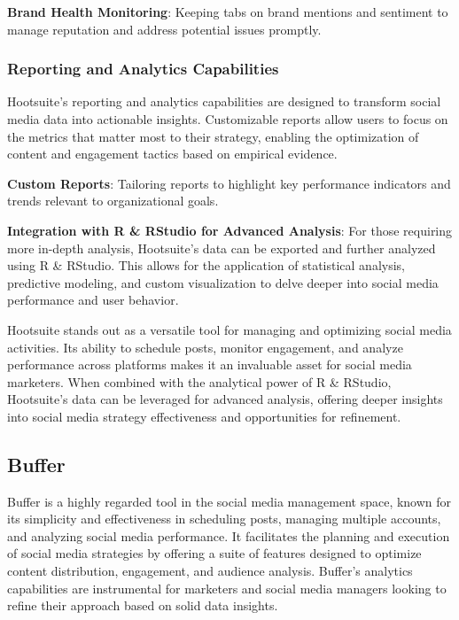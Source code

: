\documentclass[
]{book}
\begin{document}
\textbf{Brand Health Monitoring}: Keeping tabs on brand mentions and sentiment to manage reputation and address potential issues promptly.

\hypertarget{reporting-and-analytics-capabilities}{%
\subsubsection*{Reporting and Analytics Capabilities}\label{reporting-and-analytics-capabilities}}

Hootsuite's reporting and analytics capabilities are designed to transform social media data into actionable insights. Customizable reports allow users to focus on the metrics that matter most to their strategy, enabling the optimization of content and engagement tactics based on empirical evidence.

\textbf{Custom Reports}: Tailoring reports to highlight key performance indicators and trends relevant to organizational goals.

\textbf{Integration with R \& RStudio for Advanced Analysis}: For those requiring more in-depth analysis, Hootsuite's data can be exported and further analyzed using R \& RStudio. This allows for the application of statistical analysis, predictive modeling, and custom visualization to delve deeper into social media performance and user behavior.

Hootsuite stands out as a versatile tool for managing and optimizing social media activities. Its ability to schedule posts, monitor engagement, and analyze performance across platforms makes it an invaluable asset for social media marketers. When combined with the analytical power of R \& RStudio, Hootsuite's data can be leveraged for advanced analysis, offering deeper insights into social media strategy effectiveness and opportunities for refinement.

\hypertarget{buffer}{%
\subsection*{Buffer}\label{buffer}}

Buffer is a highly regarded tool in the social media management space, known for its simplicity and effectiveness in scheduling posts, managing multiple accounts, and analyzing social media performance. It facilitates the planning and execution of social media strategies by offering a suite of features designed to optimize content distribution, engagement, and audience analysis. Buffer's analytics capabilities are instrumental for marketers and social media managers looking to refine their approach based on solid data insights.
\end{document}
